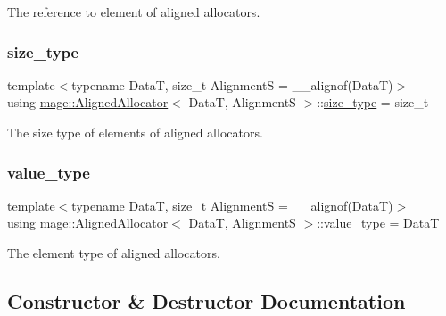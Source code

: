 The reference to element of aligned allocators. \hypertarget{structmage_1_1_aligned_allocator_a7184b9ffd131938071f9734e9291976e}{}\label{structmage_1_1_aligned_allocator_a7184b9ffd131938071f9734e9291976e} 
\subsubsection{\texorpdfstring{size\+\_\+type}{size\_type}}
{\footnotesize\ttfamily template$<$typename DataT, size\+\_\+t AlignmentS = \+\_\+\+\_\+alignof(\+Data\+T)$>$ \\
using \hyperlink{structmage_1_1_aligned_allocator}{mage\+::\+Aligned\+Allocator}$<$ DataT, AlignmentS $>$\+::\hyperlink{structmage_1_1_aligned_allocator_a7184b9ffd131938071f9734e9291976e}{size\+\_\+type} =  size\+\_\+t}

The size type of elements of aligned allocators. \hypertarget{structmage_1_1_aligned_allocator_a04614928948b5589c241726e3441e058}{}\label{structmage_1_1_aligned_allocator_a04614928948b5589c241726e3441e058} 
\subsubsection{\texorpdfstring{value\+\_\+type}{value\_type}}
{\footnotesize\ttfamily template$<$typename DataT, size\+\_\+t AlignmentS = \+\_\+\+\_\+alignof(\+Data\+T)$>$ \\
using \hyperlink{structmage_1_1_aligned_allocator}{mage\+::\+Aligned\+Allocator}$<$ DataT, AlignmentS $>$\+::\hyperlink{structmage_1_1_aligned_allocator_a04614928948b5589c241726e3441e058}{value\+\_\+type} =  DataT}

The element type of aligned allocators. 

\subsection{Constructor \& Destructor Documentation}
\hypertarget{structmage_1_1_aligned_allocator_a95363950f216346db818997988be73bf}{}\label{structmage_1_1_aligned_allocator_a95363950f216346db818997988be73bf} 
